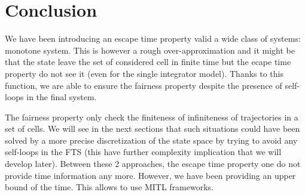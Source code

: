 \section{Conclusion}
We have been introducing an escape time property valid a wide class of systems: monotone system. This is however a rough over-approximation and it might be that the state leave the set of considered cell in finite time but the ecape time property do not see it (even for the single integrator model).
Thanks to this function, we are able to ensure the fairness property despite the presence of self-loops in the final system.

The fairness property only check the finiteness of infiniteness of trajectories in a set of cells. We will see in the next sections that such situations could have been solved by a more precise discretization of the state space by trying to avoid any self-loops in the FTS (this have further complexity implication that we will develop later). Between these 2 approaches, the escape time property one do not provide time information any more.
However, we have been providing an upper bound of the time. This allows to use MITL frameworks.